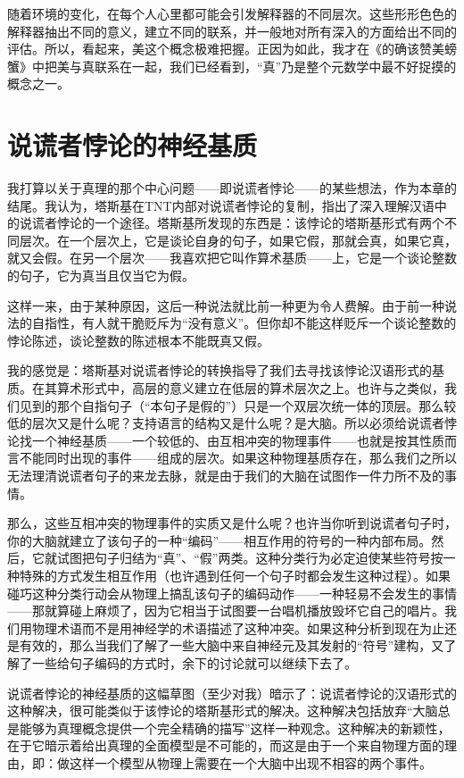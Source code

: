 随着环境的变化，在每个人心里都可能会引发解释器的不同层次。这些形形色色的解释器抽出不同的意义，建立不同的联系，并一般地对所有深入的方面给出不同的评估。所以，看起来，美这个概念极难把握。正因为如此，我才在《的确该赞美螃蟹》中把美与真联系在一起，我们已经看到，“真”乃是整个元数学中最不好捉摸的概念之一。

\section{说谎者悖论的神经基质}

我打算以关于真理的那个中心问题——即说谎者悖论——的某些想法，作为本章的结尾。我认为，塔斯基在TNT内部对说谎者悖论的复制，指出了深入理解汉语中的说谎者悖论的一个途径。塔斯基所发现的东西是：该悖论的塔斯基形式有两个不同层次。在一个层次上，它是谈论自身的句子，如果它假，那就会真，如果它真，就又会假。在另一个层次——我喜欢把它叫作算术基质——上，它是一个谈论整数的句子，它为真当且仅当它为假。

这样一来，由于某种原因，这后一种说法就比前一种更为令人费解。由于前一种说法的自指性，有人就干脆贬斥为“没有意义”。但你却不能这样贬斥一个谈论整数的悖论陈述，谈论整数的陈述根本不能既真又假。

我的感觉是：塔斯基对说谎者悖论的转换指导了我们去寻找该悖论汉语形式的基质。在其算术形式中，高层的意义建立在低层的算术层次之上。也许与之类似，我们见到的那个自指句子（“本句子是假的”）只是一个双层次统一体的顶层。那么较低的层次又是什么呢？支持语言的结构又是什么呢？是大脑。所以必须给说谎者悖论找一个神经基质——一个较低的、由互相冲突的物理事件——也就是按其性质而言不能同时出现的事件——组成的层次。如果这种物理基质存在，那么我们之所以无法理清说谎者句子的来龙去脉，就是由于我们的大脑在试图作一件力所不及的事情。

那么，这些互相冲突的物理事件的实质又是什么呢？也许当你听到说谎者句子时，你的大脑就建立了该句子的一种“编码”——相互作用的符号的一种内部布局。然后，它就试图把句子归结为“真”、“假”两类。这种分类行为必定迫使某些符号按一种特殊的方式发生相互作用（也许遇到任何一个句子时都会发生这种过程）。如果碰巧这种分类行动会从物理上搞乱该句子的编码动作——一种轻易不会发生的事情——那就算碰上麻烦了，因为它相当于试图要一台唱机播放毁坏它自己的唱片。我们用物理术语而不是用神经学的术语描述了这种冲突。如果这种分析到现在为止还是有效的，那么当我们了解了一些大脑中来自神经元及其发射的“符号”建构，又了解了一些给句子编码的方式时，余下的讨论就可以继续下去了。

说谎者悖论的神经基质的这幅草图（至少对我）暗示了：说谎者悖论的汉语形式的这种解决，很可能类似于该悖论的塔斯基形式的解决。这种解决包括放弃“大脑总是能够为真理概念提供一个完全精确的描写”这样一种观念。这种解决的新颖性，在于它暗示着给出真理的全面模型是不可能的，而这是由于一个来自物理方面的理由，即：做这样一个模型从物理上需要在一个大脑中出现不相容的两个事件。

